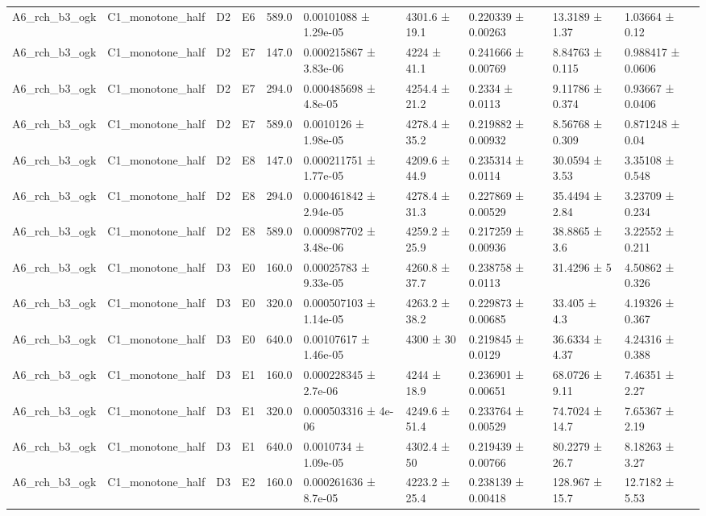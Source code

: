 \begin{table}
\begin{tabular}{llllllllll}
A6\_rch\_b3\_ogk & C1\_monotone\_half & D2 & E6 & 589.0 & 0.00101088 ± 1.29e-05 & 4301.6 ± 19.1 & 0.220339 ± 0.00263 & 13.3189 ± 1.37 & 1.03664 ± 0.12 \\
A6\_rch\_b3\_ogk & C1\_monotone\_half & D2 & E7 & 147.0 & 0.000215867 ± 3.83e-06 & 4224 ± 41.1 & 0.241666 ± 0.00769 & 8.84763 ± 0.115 & 0.988417 ± 0.0606 \\
A6\_rch\_b3\_ogk & C1\_monotone\_half & D2 & E7 & 294.0 & 0.000485698 ± 4.8e-05 & 4254.4 ± 21.2 & 0.2334 ± 0.0113 & 9.11786 ± 0.374 & 0.93667 ± 0.0406 \\
A6\_rch\_b3\_ogk & C1\_monotone\_half & D2 & E7 & 589.0 & 0.0010126 ± 1.98e-05 & 4278.4 ± 35.2 & 0.219882 ± 0.00932 & 8.56768 ± 0.309 & 0.871248 ± 0.04 \\
A6\_rch\_b3\_ogk & C1\_monotone\_half & D2 & E8 & 147.0 & 0.000211751 ± 1.77e-05 & 4209.6 ± 44.9 & 0.235314 ± 0.0114 & 30.0594 ± 3.53 & 3.35108 ± 0.548 \\
A6\_rch\_b3\_ogk & C1\_monotone\_half & D2 & E8 & 294.0 & 0.000461842 ± 2.94e-05 & 4278.4 ± 31.3 & 0.227869 ± 0.00529 & 35.4494 ± 2.84 & 3.23709 ± 0.234 \\
A6\_rch\_b3\_ogk & C1\_monotone\_half & D2 & E8 & 589.0 & 0.000987702 ± 3.48e-06 & 4259.2 ± 25.9 & 0.217259 ± 0.00936 & 38.8865 ± 3.6 & 3.22552 ± 0.211 \\
A6\_rch\_b3\_ogk & C1\_monotone\_half & D3 & E0 & 160.0 & 0.00025783 ± 9.33e-05 & 4260.8 ± 37.7 & 0.238758 ± 0.0113 & 31.4296 ± 5 & 4.50862 ± 0.326 \\
A6\_rch\_b3\_ogk & C1\_monotone\_half & D3 & E0 & 320.0 & 0.000507103 ± 1.14e-05 & 4263.2 ± 38.2 & 0.229873 ± 0.00685 & 33.405 ± 4.3 & 4.19326 ± 0.367 \\
A6\_rch\_b3\_ogk & C1\_monotone\_half & D3 & E0 & 640.0 & 0.00107617 ± 1.46e-05 & 4300 ± 30 & 0.219845 ± 0.0129 & 36.6334 ± 4.37 & 4.24316 ± 0.388 \\
A6\_rch\_b3\_ogk & C1\_monotone\_half & D3 & E1 & 160.0 & 0.000228345 ± 2.7e-06 & 4244 ± 18.9 & 0.236901 ± 0.00651 & 68.0726 ± 9.11 & 7.46351 ± 2.27 \\
A6\_rch\_b3\_ogk & C1\_monotone\_half & D3 & E1 & 320.0 & 0.000503316 ± 4e-06 & 4249.6 ± 51.4 & 0.233764 ± 0.00529 & 74.7024 ± 14.7 & 7.65367 ± 2.19 \\
A6\_rch\_b3\_ogk & C1\_monotone\_half & D3 & E1 & 640.0 & 0.0010734 ± 1.09e-05 & 4302.4 ± 50 & 0.219439 ± 0.00766 & 80.2279 ± 26.7 & 8.18263 ± 3.27 \\
A6\_rch\_b3\_ogk & C1\_monotone\_half & D3 & E2 & 160.0 & 0.000261636 ± 8.7e-05 & 4223.2 ± 25.4 & 0.238139 ± 0.00418 & 128.967 ± 15.7 & 12.7182 ± 5.53 \\

\end{tabular}
\end{table}
